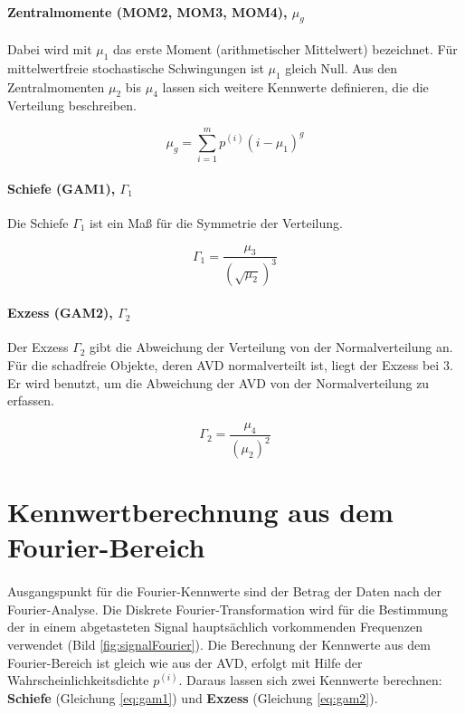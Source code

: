 \paragraph{Zentralmomente (MOM2, MOM3, MOM4), $\mu_{g}$\\}
Dabei wird mit $\mu_{1}$ das erste Moment (arithmetischer Mittelwert) bezeichnet. F\"ur mittelwertfreie stochastische Schwingungen ist $\mu_{1}$ gleich Null. Aus den Zentralmomenten $\mu_{2}$ bis $\mu_{4}$ lassen sich weitere Kennwerte definieren, die die Verteilung beschreiben.

\begin{equation}
\mu_{g}=\sum_{i=1}^{m}p^{(i)}(i-\mu_{1})^{g}
\end{equation}

\paragraph{Schiefe (GAM1), $\Gamma_{1}$\\}
Die Schiefe $\Gamma_{1}$ ist ein Ma\ss{} f\"ur die Symmetrie der Verteilung.

\begin{equation} \label{eq:gam1}
\Gamma_{1}=\frac{\mu_{3}}{(\sqrt{\mu_{2}})^{3}}
\end{equation}

\paragraph{Exzess (GAM2), $\Gamma_{2}$\\}
Der Exzess $\Gamma_{2}$ gibt die Abweichung der Verteilung von der Normalverteilung an. F\"ur die schadfreie Objekte, deren AVD normalverteilt ist, liegt der Exzess bei 3. Er wird benutzt, um die Abweichung der AVD von der Normalverteilung zu erfassen.

\begin{equation} \label{eq:gam2}
\Gamma_{2}=\frac{\mu_{4}}{(\mu_{2})^{2}}
\end{equation}

\section{Kennwertberechnung aus dem Fourier-Bereich}

\paragraph{}
Ausgangspunkt f\"ur die Fourier-Kennwerte sind der Betrag der Daten nach der Fourier-Analyse. Die Diskrete Fourier-Transformation wird f\"ur die Bestimmung der in einem abgetasteten Signal haupts\"achlich vorkommenden Frequenzen verwendet (Bild \ref{fig:signalFourier}). Die Berechnung der Kennwerte aus dem Fourier-Bereich ist gleich wie aus der AVD, erfolgt mit Hilfe der Wahrscheinlichkeitsdichte $p^{(i)}$. Daraus lassen sich zwei Kennwerte berechnen: \textbf{Schiefe} (Gleichung \ref{eq:gam1}) und \textbf{Exzess} (Gleichung \ref{eq:gam2}).

